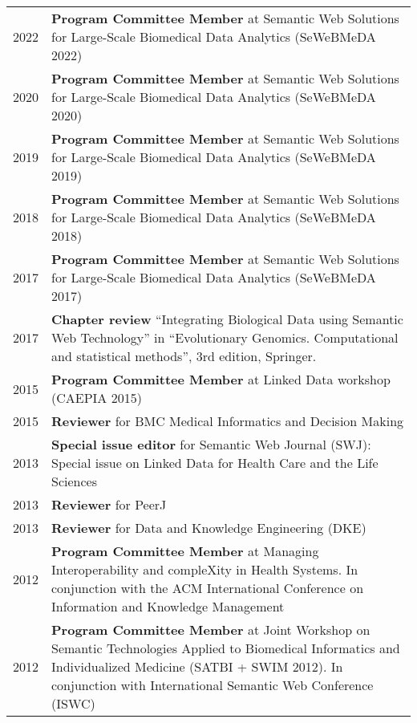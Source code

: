 \documentclass[11pt,fullpage]{article}
\begin{document}

\begin{longtable}{p{0.5in}|p{5.5in}}

2022 & \textbf{Program Committee Member} at Semantic Web Solutions for Large-Scale Biomedical Data Analytics (SeWeBMeDA 2022) \\
2020 & \textbf{Program Committee Member} at Semantic Web Solutions for Large-Scale Biomedical Data Analytics (SeWeBMeDA 2020) \\
2019 & \textbf{Program Committee Member} at Semantic Web Solutions for Large-Scale Biomedical Data Analytics (SeWeBMeDA 2019) \\  
2018 & \textbf{Program Committee Member} at Semantic Web Solutions for Large-Scale Biomedical Data Analytics (SeWeBMeDA 2018) \\
2017 & \textbf{Program Committee Member} at Semantic Web Solutions for Large-Scale Biomedical Data Analytics (SeWeBMeDA 2017) \\
2017 & \textbf{Chapter review} ``Integrating Biological Data using Semantic Web Technology'' in ``Evolutionary Genomics. Computational and statistical methods'', 3rd edition, Springer. \\
2015 & \textbf{Program Committee Member} at Linked Data workshop (CAEPIA 2015) \\
2015  & \textbf{Reviewer} for BMC Medical Informatics and Decision Making \\
2013 & {\bf Special issue editor} for Semantic Web Journal (SWJ): Special issue on Linked Data for Health Care and the Life Sciences \\
2013  & \textbf{Reviewer} for PeerJ \\
2013  & \textbf{Reviewer} for Data and Knowledge Engineering (DKE) \\
2012 & \textbf{Program Committee Member} at Managing Interoperability and compleXity in Health Systems. In conjunction with the ACM International Conference on Information and Knowledge Management\\
2012 & \textbf{Program Committee Member} at Joint Workshop on Semantic Technologies Applied to Biomedical Informatics and Individualized Medicine (SATBI + SWIM 2012). In conjunction with International Semantic Web Conference (ISWC)\\

\end{longtable}
\end{document}
